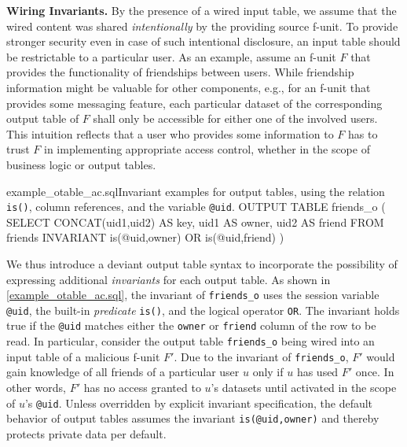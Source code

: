 \documentclass{src/acm_proc_article-sp} \else
\newcommand\myparagraph[1]{\medskip\noindent\textbf{#1.}}
\begin{document}
\myparagraph{Wiring Invariants}
By the presence of a wired input table, we assume that the wired
content was shared \emph{intentionally} by the providing source
f-unit. To provide stronger security even in case of such intentional
disclosure, an input table should be restrictable to a particular
user.
As an example, assume an f-unit $F$ that provides the functionality
of friendships between users. While friendship information might be
valuable for other components, e.g., for an f-unit that provides some
messaging feature, each particular dataset of the corresponding
output table of $F$ shall only be accessible for either one of the
involved users. This intuition reflects that a user who provides some
information to $F$ has to trust $F$ in implementing appropriate
access control, whether in the scope of business logic or output
tables.

\begin{lstfloat}{example_otable_ac.sql}{Invariant examples for output tables, using the relation \texttt{is()}, column references, and the variable \texttt{@uid}.}
  OUTPUT TABLE friends_o (
    SELECT    CONCAT(uid1,uid2) AS key,  uid1 AS owner,  uid2 AS friend
    FROM      friends
    INVARIANT is(@uid,owner) OR is(@uid,friend) )
\end{lstfloat}
We thus introduce a deviant output table syntax to incorporate the
possibility of expressing additional \emph{invariants} for each
output table.
As shown in \autoref{example_otable_ac.sql}, the invariant of
\texttt{friends\_o} uses the session variable \texttt{@uid}, the
built-in \emph{predicate} \texttt{is()}, and the logical operator
\texttt{OR}.
The invariant holds true if the \texttt{@uid} matches either the
\texttt{owner} or \texttt{friend} column of the row to be read.
In particular, consider the output table \texttt{friends\_o} being
wired into an input table of a malicious f-unit $F'$. Due to the
invariant of \texttt{friends\_o}, $F'$ would gain knowledge of all
friends of a particular user $u$ only if $u$ has used $F'$ once.
In other words, $F'$ has no access granted to $u$'s datasets until
activated in the scope of $u$'s \texttt{@uid}.
Unless overridden by explicit invariant specification, the default
behavior of output tables assumes the invariant
\texttt{is(@uid,owner)} and thereby protects private data per default.
\end{document}
